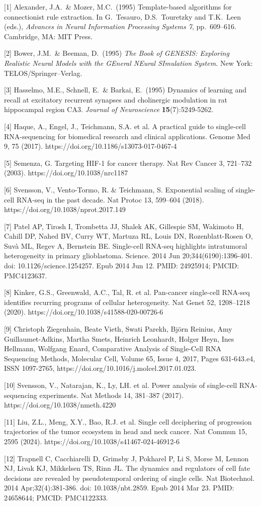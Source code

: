 \documentclass{article}
\begin{document}
[1] Alexander, J.A.\ \& Mozer, M.C.\ (1995) Template-based algorithms for
connectionist rule extraction. In G.\ Tesauro, D.S.\ Touretzky and T.K.\ Leen
(eds.), {\it Advances in Neural Information Processing Systems 7},
pp.\ 609--616. Cambridge, MA: MIT Press.


[2] Bower, J.M.\ \& Beeman, D.\ (1995) {\it The Book of GENESIS: Exploring
  Realistic Neural Models with the GEneral NEural SImulation System.}  New York:
TELOS/Springer--Verlag.


[3] Hasselmo, M.E., Schnell, E.\ \& Barkai, E.\ (1995) Dynamics of learning and
recall at excitatory recurrent synapses and cholinergic modulation in rat
hippocampal region CA3. {\it Journal of Neuroscience} {\bf 15}(7):5249-5262.

[4] Haque, A., Engel, J., Teichmann, S.A. et al. A practical guide to single-cell RNA-sequencing for biomedical research and clinical applications. Genome Med 9, 75 (2017). https://doi.org/10.1186/s13073-017-0467-4

[5] Semenza, G. Targeting HIF-1 for cancer therapy. Nat Rev Cancer 3, 721–732 (2003). https://doi.org/10.1038/nrc1187

[6] Svensson, V., Vento-Tormo, R. \& Teichmann, S. Exponential scaling of single-cell RNA-seq in the past decade. Nat Protoc 13, 599–604 (2018). https://doi.org/10.1038/nprot.2017.149

[7] Patel AP, Tirosh I, Trombetta JJ, Shalek AK, Gillespie SM, Wakimoto H, Cahill DP, Nahed BV, Curry WT, Martuza RL, Louis DN, Rozenblatt-Rosen O, Suvà ML, Regev A, Bernstein BE. Single-cell RNA-seq highlights intratumoral heterogeneity in primary glioblastoma. Science. 2014 Jun 20;344(6190):1396-401. doi: 10.1126/science.1254257. Epub 2014 Jun 12. PMID: 24925914; PMCID: PMC4123637.

[8] Kinker, G.S., Greenwald, A.C., Tal, R. et al. Pan-cancer single-cell RNA-seq identifies recurring programs of cellular heterogeneity. Nat Genet 52, 1208–1218 (2020). https://doi.org/10.1038/s41588-020-00726-6

[9] Christoph Ziegenhain, Beate Vieth, Swati Parekh, Björn Reinius, Amy Guillaumet-Adkins, Martha Smets, Heinrich Leonhardt, Holger Heyn, Ines Hellmann, Wolfgang Enard, Comparative Analysis of Single-Cell RNA Sequencing Methods, Molecular Cell, Volume 65, Issue 4, 2017, Pages 631-643.e4, ISSN 1097-2765, https://doi.org/10.1016/j.molcel.2017.01.023.

[10] Svensson, V., Natarajan, K., Ly, LH. et al. Power analysis of single-cell RNA-sequencing experiments. Nat Methods 14, 381–387 (2017). https://doi.org/10.1038/nmeth.4220

[11] Liu, Z.L., Meng, X.Y., Bao, R.J. et al. Single cell deciphering of progression trajectories of the tumor ecosystem in head and neck cancer. Nat Commun 15, 2595 (2024). https://doi.org/10.1038/s41467-024-46912-6

[12] Trapnell C, Cacchiarelli D, Grimsby J, Pokharel P, Li S, Morse M, Lennon NJ, Livak KJ, Mikkelsen TS, Rinn JL. The dynamics and regulators of cell fate decisions are revealed by pseudotemporal ordering of single cells. Nat Biotechnol. 2014 Apr;32(4):381-386. doi: 10.1038/nbt.2859. Epub 2014 Mar 23. PMID: 24658644; PMCID: PMC4122333.
\end{document}

